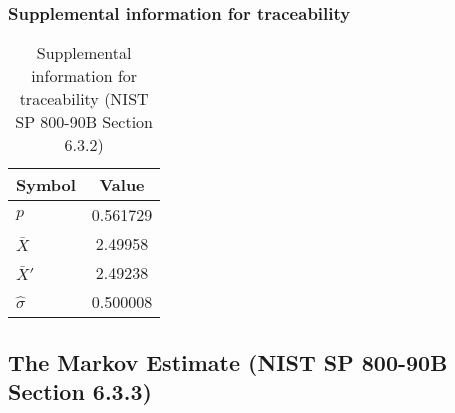 \documentclass[a3paper,xelatex,english]{bxjsarticle}
\begin{document}
\subsubsection{Supplemental information for traceability}
\renewcommand{\arraystretch}{1.8}
\begin{table}[h]
\caption{Supplemental information for traceability (NIST SP 800-90B Section 6.3.2)}
\begin{center}
\begin{tabular}{|l|c|}
\hline 
\rowcolor{anotherlightblue} %
Symbol				& Value \\ \hline 
$p$				& 0.561729\\ \hline 
$\bar{X}$ 		&  2.49958\\ \hline
$\bar{X}'$		&  2.49238\\ \hline
$\hat{\sigma}$		& 0.500008\\ \hline
\end{tabular}
\end{center}
\end{table}
\renewcommand{\arraystretch}{1.4}
\clearpage
\subsection{The Markov Estimate (NIST SP 800-90B Section 6.3.3)}\label{sec:Binary633}
\end{document}
